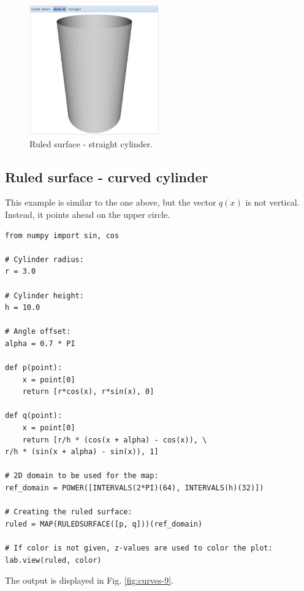 \documentclass{article}
\begin{document}
\begin{figure}[!ht]
\begin{center}
\includegraphics[width=0.5\textwidth]{img/curves-8.png}
\end{center}
\vspace{-2mm}
\caption{Ruled surface - straight cylinder.}
\label{fig:curves-8}
\end{figure}

\subsection{Ruled surface - curved cylinder}

This example is similar to the one above, but the vector 
$q(x)$ is not vertical. Instead, it points ahead on the
upper circle.

\begin{verbatim}
from numpy import sin, cos

# Cylinder radius:
r = 3.0

# Cylinder height:
h = 10.0

# Angle offset:
alpha = 0.7 * PI

def p(point):
    x = point[0]
    return [r*cos(x), r*sin(x), 0]
  
def q(point):
    x = point[0]
    return [r/h * (cos(x + alpha) - cos(x)), \
r/h * (sin(x + alpha) - sin(x)), 1]

# 2D domain to be used for the map:  
ref_domain = POWER([INTERVALS(2*PI)(64), INTERVALS(h)(32)])

# Creating the ruled surface:
ruled = MAP(RULEDSURFACE([p, q]))(ref_domain)

# If color is not given, z-values are used to color the plot:
lab.view(ruled, color)
\end{verbatim}
The output is displayed in Fig. \ref{fig:curves-9}.
\end{document}

